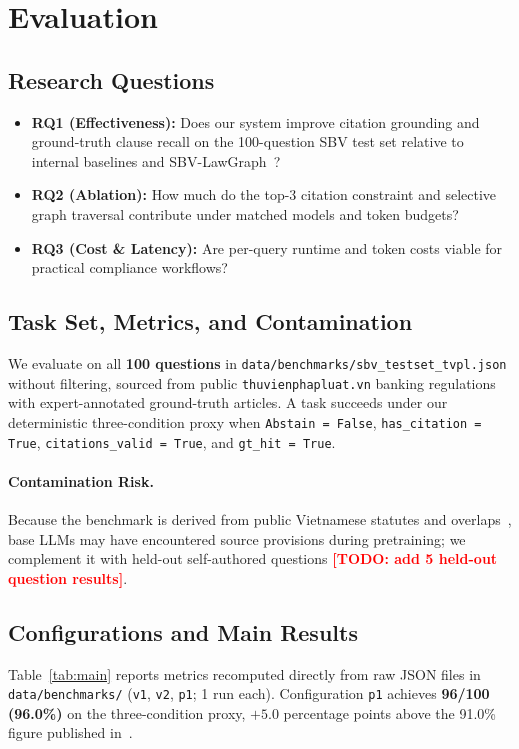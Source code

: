 \documentclass[sigconf,nonacm]{acmart}
\newcommand{\TODO}[1]{\textcolor{red}{\textbf{[TODO: #1]}}}
\begin{document}
\section{Evaluation}
\label{sec:eval}

\subsection{Research Questions}
\begin{itemize}[leftmargin=*]
  \item \textbf{RQ1 (Effectiveness):} Does our system improve citation grounding and ground-truth clause recall on the 100-question SBV test set relative to internal baselines and SBV-LawGraph~\cite{phan2026sbv}?
  \item \textbf{RQ2 (Ablation):} How much do the top-3 citation constraint and selective graph traversal contribute under matched models and token budgets?
  \item \textbf{RQ3 (Cost \& Latency):} Are per-query runtime and token costs viable for practical compliance workflows?
\end{itemize}

\subsection{Task Set, Metrics, and Contamination}
We evaluate on all \textbf{100 questions} in \texttt{data/benchmarks/sbv\_testset\_tvpl.json} without filtering, sourced from public \texttt{thuvienphapluat.vn} banking regulations with expert-annotated ground-truth articles. A task succeeds under our deterministic three-condition proxy when \texttt{Abstain = False}, \texttt{has\_citation = True}, \texttt{citations\_valid = True}, and \texttt{gt\_hit = True}.
\paragraph{Contamination Risk.} Because the benchmark is derived from public Vietnamese statutes and overlaps~\cite{phan2026sbv}, base LLMs may have encountered source provisions during pretraining; we complement it with held-out self-authored questions \TODO{add 5 held-out question results}.

\subsection{Configurations and Main Results}
Table~\ref{tab:main} reports metrics recomputed directly from raw JSON files in \texttt{data/benchmarks/} (\texttt{v1}, \texttt{v2}, \texttt{p1}; 1 run each). Configuration \texttt{p1} achieves \textbf{96/100 (96.0\%)} on the three-condition proxy, $+5.0$ percentage points above the 91.0\% figure published in~\cite{phan2026sbv}.
\end{document}
